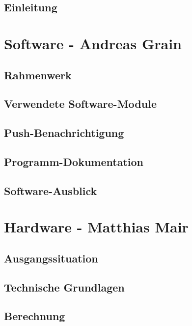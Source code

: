 \documentclass[a4paper, twoside, 12pt, openright, final]{memoir}
\newcommand{\AndreasGrain}{Andreas Grain}
\newcommand{\MatthiasMair}{Matthias Mair}
\newcommand{\authorName}{\AndreasGrain\ / \MatthiasMair}
\begin{document}
\mainmatter
\chapter{Einleitung}

\clearpage

\renewcommand{\authorName}{\AndreasGrain}
\part{Software - \AndreasGrain}
\chapter{Rahmenwerk}

\chapter{Verwendete Software-Module}

\chapter{Push-Benachrichtigung}

\chapter{Programm-Dokumentation}

\chapter{Software-Ausblick}

\clearpage

\renewcommand{\authorName}{\MatthiasMair}
\part{Hardware - \MatthiasMair}
\chapter{Ausgangssituation}

\chapter{Technische Grundlagen}

\chapter{Berechnung}

\end{document}
